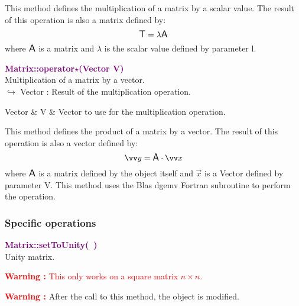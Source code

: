 This method defines the multiplication of a matrix by a scalar value.
The result of this operation is also a matrix defined by:
\begin{equation*}
\mbox{\large\ensuremath{\mathsf{T}}} = \lambda \mbox{\large\ensuremath{\mathsf{A}}}
\end{equation*}
where $\mbox{\large\ensuremath{\mathsf{A}}}$ is a matrix and $\lambda$ is the scalar value defined by parameter l.

\textcolor{purple}{\textbf{Matrix::operator$\star$(Vector V)}}\label{Matrix::operator*(Vector V)}\\
Multiplication of a matrix by a vector.\\ \hspace*{10mm}$\hookrightarrow$ Vector : Result of the multiplication operation.

\begin{tcolorbox}[width=\textwidth,myArgs,tabularx={ll|R}]
Vector & V & Vector to use for the multiplication operation.
\end{tcolorbox}

This method defines the product of a matrix by a vector.
The result of this operation is also a vector defined by:
\begin{equation*}
\overrightarrow{y} = \A \cdot \overrightarrow{x}
\end{equation*}
where $\mbox{\large\ensuremath{\mathsf{A}}}$ is a matrix defined by the object itself and $\overrightarrow{x}$ is a Vector defined by parameter V.
This method uses the Blas \textsf{dgemv} Fortran subroutine to perform the operation.

\subsubsection{Specific operations}

\textcolor{purple}{\textbf{Matrix::setToUnity(~)}}\label{Matrix::setToUnity()}\\
Unity matrix.

\hspace*{10mm}\textcolor{red}{\textbf{Warning :} This only works on a square matrix $n \times n$.}

\hspace*{10mm}\textcolor{red}{\textbf{Warning :}} After the call to this method, the object is modified.

